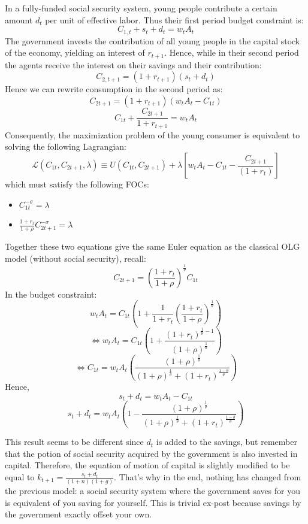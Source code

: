 \documentclass[12pt]{report}
\begin{document}
In a fully-funded social security system, young people contribute a certain amount $d_t$ per unit of effective labor. Thus their first period budget constraint is: $$C_{1,t} + s_t + d_t = w_tA_t $$ The government invests the contribution of all young people in the capital stock of the economy, yielding an interest of $r_{t+1}$. Hence, while in their second period the agents receive the interest on their savings and their contribution: $$C_{2,t+1} = (1 + r_{t+1})(s_t + d_t) $$ Hence we can rewrite consumption in the second period as: $$C_{2t+1} = (1 + r_{t+1})(w_tA_t - C_{1t}) $$ $$C_{1t} + \frac{C_{2t+1}}{1 + r_{t+1}} = w_tA_t $$ Consequently, the maximization problem of the young consumer is equivalent to solving the following Lagrangian: $$ \mathcal{L}(C_{1t},C_{2t+1},\lambda) \equiv  U(C_{1t}, C_{2t+1}) + \lambda \left[w_tA_t - C_{1t} - \frac{C_{2t+1}}{(1+r_t)}\right] $$ which must satisfy the following FOCs:\begin{itemize}
\item $C_{1t}^{-\sigma} = \lambda $
\item $\frac{1 + r_t}{1+\rho} C_{2t+1}^{-\sigma} = \lambda $
\end{itemize}
Together these two equations give the same Euler equation as the classical OLG model (without social security), recall: $$ C_{2t+1} = \left(\frac{1+r_t}{1+\rho}\right)^{\frac{1}{\theta}} C_{1t} $$ In the budget constraint: $$w_tA_t = C_{1t} \left( 1 + \frac{1}{1+r_t}\left(\frac{1+r_t}{1+\rho}\right)^{\frac{1}{\theta}}\right) $$ $$\Leftrightarrow w_tA_t = C_{1t} \left( 1 + \frac{(1+r_t)^{\frac{1}{\theta} - 1}}{(1+\rho)^{\frac{1}{\theta}}}\right) $$ $$\Leftrightarrow C_{1t} = w_tA_t \left(\frac{(1+\rho)^{\frac{1}{\theta}}}{(1+\rho)^{\frac{1}{\theta}} + (1+r_t)^{\frac{1-\theta}{\theta}}}\right) $$ Hence, $$s_t + d_t = w_tA_t - C_{1t} $$ $$s_t + d_t = w_tA_t\left(1 - \frac{(1+\rho)^{\frac{1}{\theta}}}{(1+\rho)^{\frac{1}{\theta}} + (1+r_t)^{\frac{1-\theta}{\theta}}}\right) $$

This result seems to be different since $d_t$ is added to the savings, but remember that the potion of social security acquired by the government is also invested in capital. Therefore, the equation of motion of capital is slightly modified to be equal to $k_{t+1} = \frac{s_t + d_t}{(1+n)(1+g)}$. That's why in the end, nothing has changed from the previous model: a social security system where the government saves for you is equivalent of you saving for yourself. This is trivial ex-post because savings by the government exactly offset your own.
\end{document}
